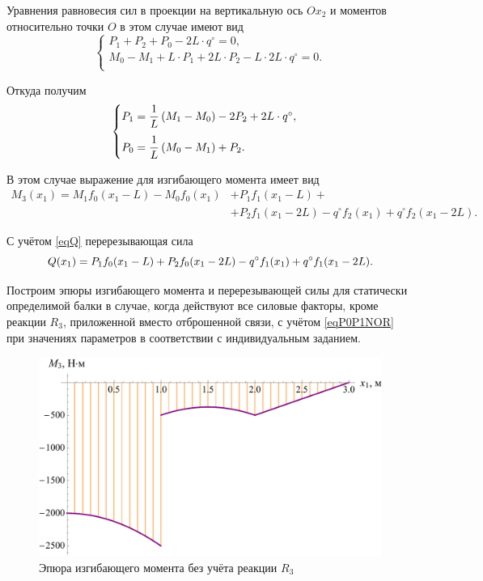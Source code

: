 \documentclass[12pt, a4paper]{article}
\begin{document}
	Уравнения равновесия сил в проекции на вертикальную ось $Ox_2$ и моментов относительно точки $O$ в этом случае имеют вид
	\vspace{-0.5em}
	\begin{equation*}
		\begin{cases}
			P_1 + P_2 + P_0 - 2L \cdot q^{\circ} = 0, \\
			M_0 - M_1 + L \cdot P_1 + 2L \cdot P_2 - L \cdot 2L \cdot q^{\circ} = 0. \\
		\end{cases}
	\end{equation*}
	
	Откуда получим
	\begin{equation}
		\begin{cases} \vspace{0.75em}
			P_1 = \dfrac{1}{L} \left( M_1 - M_0 \right) - 2 P_2 + 2L \cdot q^{\circ}, \\ 
			P_0 = \dfrac{1}{L} \left( M_0 - M_1 \right) + P_2. \\
		\end{cases}
		\label{eqP0P1NOR}
	\end{equation}
	
	В этом случае выражение для изгибающего момента имеет вид
	\begin{equation}
		\begin{split}
			M_3(x_1) = M_1 f_0(x_1 - L) - M_0 f_0(x_1) & + P_1 f_1(x_1 - L) + \\ & + P_2 f_1(x_1 - 2L) - q^{\circ} f_2(x_1) + q^{\circ} f_2(x_1 - 2L).
		\end{split}
		\label{eqM3NOR}
	\end{equation}
	
	С учётом \eqref{eqQ} перерезывающая сила
	\begin{equation}
		Q(x_1) = P_1 f_0(x_1 - L) + P_2 f_0(x_1 - 2L) - q^{\circ} f_1(x_1) + q^{\circ} f_1(x_1 - 2L).\\
		\label{eqQNOR}
	\end{equation}
	
	Построим эпюры изгибающего момента и перерезывающей силы для статически определимой балки в случае, когда действуют все силовые факторы, кроме реакции $R_3$, приложенной вместо отброшенной связи, с учётом \eqref{eqP0P1NOR} при  значениях параметров в соответствии с индивидуальным заданием.
	
	\newpage
	
	\begin{figure}[!h]
		\centering
		\includegraphics[width=0.7\linewidth]{plot-8}
		\caption{Эпюра изгибающего момента без учёта реакции $R_3$}
	\end{figure} 
	
\end{document}
